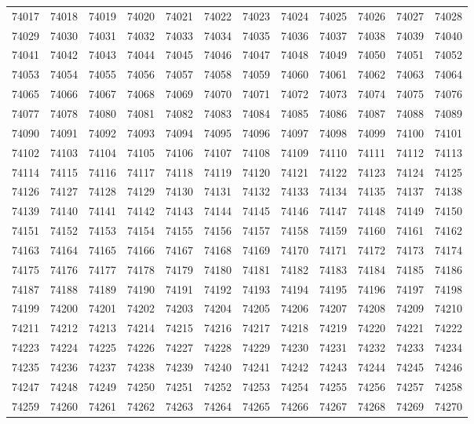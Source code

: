 \begin{center}
\begin{longtable}{llllllllllll}
74017 &74018 &74019 &74020 &74021 &74022 &74023 &74024 &74025 &74026 &74027 &74028 \\
74029 &74030 &74031 &74032 &74033 &74034 &74035 &74036 &74037 &74038 &74039 &74040 \\
74041 &74042 &74043 &74044 &74045 &74046 &74047 &74048 &74049 &74050 &74051 &74052 \\
74053 &74054 &74055 &74056 &74057 &74058 &74059 &74060 &74061 &74062 &74063 &74064 \\
74065 &74066 &74067 &74068 &74069 &74070 &74071 &74072 &74073 &74074 &74075 &74076 \\
74077 &74078 &74080 &74081 &74082 &74083 &74084 &74085 &74086 &74087 &74088 &74089 \\
74090 &74091 &74092 &74093 &74094 &74095 &74096 &74097 &74098 &74099 &74100 &74101 \\
74102 &74103 &74104 &74105 &74106 &74107 &74108 &74109 &74110 &74111 &74112 &74113 \\
74114 &74115 &74116 &74117 &74118 &74119 &74120 &74121 &74122 &74123 &74124 &74125 \\
74126 &74127 &74128 &74129 &74130 &74131 &74132 &74133 &74134 &74135 &74137 &74138 \\
74139 &74140 &74141 &74142 &74143 &74144 &74145 &74146 &74147 &74148 &74149 &74150 \\
74151 &74152 &74153 &74154 &74155 &74156 &74157 &74158 &74159 &74160 &74161 &74162 \\
74163 &74164 &74165 &74166 &74167 &74168 &74169 &74170 &74171 &74172 &74173 &74174 \\
74175 &74176 &74177 &74178 &74179 &74180 &74181 &74182 &74183 &74184 &74185 &74186 \\
74187 &74188 &74189 &74190 &74191 &74192 &74193 &74194 &74195 &74196 &74197 &74198 \\
74199 &74200 &74201 &74202 &74203 &74204 &74205 &74206 &74207 &74208 &74209 &74210 \\
74211 &74212 &74213 &74214 &74215 &74216 &74217 &74218 &74219 &74220 &74221 &74222 \\
74223 &74224 &74225 &74226 &74227 &74228 &74229 &74230 &74231 &74232 &74233 &74234 \\
74235 &74236 &74237 &74238 &74239 &74240 &74241 &74242 &74243 &74244 &74245 &74246 \\
74247 &74248 &74249 &74250 &74251 &74252 &74253 &74254 &74255 &74256 &74257 &74258 \\
74259 &74260 &74261 &74262 &74263 &74264 &74265 &74266 &74267 &74268 &74269 &74270 \\

\end{longtable}
\end{center}
